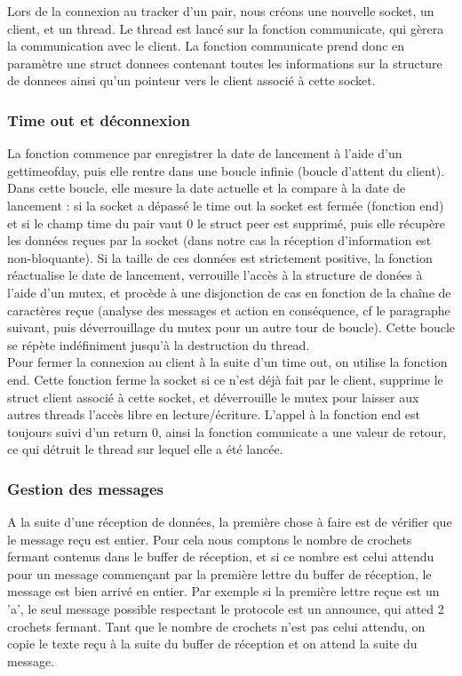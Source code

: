 Lors de la connexion au tracker d'un pair, nous créons une nouvelle socket, un client, et un thread. Le thread est lancé sur la fonction communicate, qui gèrera la communication avec le client. La fonction communicate prend donc en paramètre une struct donnees contenant toutes les informations sur la structure de donnees ainsi qu'un pointeur vers le client associé à cette socket.

\subsubsection{Time out et déconnexion}
La fonction commence par enregistrer la date de lancement à l'aide d'un gettimeofday, puis elle rentre dans une boucle infinie (boucle d'attent du client). Dans cette boucle, elle mesure la date actuelle et la compare à la date de lancement : si la socket a dépassé le time out la socket est fermée (fonction end) et si le champ time du pair vaut 0 le struct peer est supprimé, puis elle récupère les données reçues par la socket (dans notre cas la réception d'information est non-bloquante). Si la taille de ces données est strictement positive, la fonction réactualise le date de lancement, verrouille l'accès à la structure de donées à l'aide d'un mutex, et procède à une disjonction de cas en fonction de la chaîne de caractères reçue (analyse des messages et action en conséquence, cf le paragraphe suivant, puis déverrouillage du mutex pour un autre tour de boucle). Cette boucle se répète indéfiniment jusqu'à la destruction du thread.\\

Pour fermer la connexion au client à la suite d'un time out, on utilise la fonction end. Cette fonction ferme la socket si ce n'est déjà fait par le client, supprime le struct client associé à cette socket, et déverrouille le mutex pour laisser aux autres threads l'accès libre en lecture/écriture. L'appel à la fonction end est toujours suivi d'un return 0, ainsi la fonction comunicate a une valeur de retour, ce qui détruit le thread sur lequel elle a été lancée.

\subsubsection{Gestion des messages}

A la suite d'une réception de données, la première chose à faire est de vérifier que le message reçu est entier. Pour cela nous comptons le nombre de crochets fermant contenus dans le buffer de réception, et si ce nombre est celui attendu pour un message commençant par la première lettre du buffer de réception, le message est bien arrivé en entier. Par exemple si la première lettre reçue est un 'a', le seul message possible respectant le protocole est un announce, qui atted 2 crochets fermant. Tant que le nombre de crochets n'est pas celui attendu, on copie le texte reçu à la suite du buffer de réception et on attend la suite du message.\\

